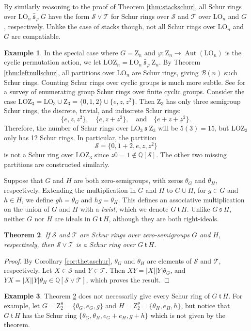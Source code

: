 \documentclass{article}
\theoremstyle{plain}
\newtheorem{Thm}{Theorem}[section]
\theoremstyle{definition}
\newtheorem{Exam}[Thm]{Example}
\newcommand{\thmref}[1]{Theorem \ref{#1}}
\newcommand{\corref}[1]{Corollary \ref{#1}}
\renewcommand{\S}{\mathcal{S}}
\newcommand{\T}{\mathcal{T}}
\newcommand{\Q}{\mathbb{Q}}
\newcommand{\QS}{\Q[\S]}
\newcommand{\B}{\mathscr{B}}
\newcommand{\LO}{\mathrm{LO}}
\newcommand{\LOZ}{\mathrm{LOZ}}
\newcommand{\z}{\mathrm{Z}}
\newcommand{\s}{\ \mathfrak{s}\ }
\newcommand{\shat}{\ \hat{\mathfrak{s}}_\varphi\ }
\renewcommand{\t}{\ \mathfrak{t}\ }
\DeclareMathOperator*{\Aut}{Aut}
\begin{document}
By similarly reasoning to the proof of \thmref{thm:stackschur}, all Schur rings over $\LO_n\shat G$ have the form $\S\vee\T$ for Schur rings over $\S$ and $\T$ over $\LO_n$ and $G$, respectively. Unlike the case of stacks though, not all Schur rings over $\LO_n$ and $G$ are compatiable.

\begin{Exam}
    In the special case where $G=\z_n$ and $\varphi : \z_n \to \Aut(\LO_n)$ is the cyclic permutation action, we let \label{lozn}$\LOZ_n = \LO_n\shat \z_n$. By \thmref{thm:leftnullschur}, all partitions over $\LO_n$ are Schur rings, giving $\B(n)$ such Schur rings. Counting Schur rings over cyclic groups is much more subtle. See \cite{CountingII} for a survey of enumerating group Schur rings over finite cyclic groups. Consider the case $\LOZ_3 = \LO_3\cup \z_3 = \{0,1,2\}\cup \{e,z,z^2\}$. Then $\z_3$ has only three semigroup Schur rings, the discrete, trivial, and indiscrete Schur rings: \[\{ e,z,z^2 \},\quad \{ e, z+z^2 \},\quad\text{and}\quad \{ e+z+z^2\}.\] Therefore, the number of Schur rings over $\LO_3\s\z_3$ will be $5(3)=15$, but $\LOZ_3$ only has 12 Schur rings. In particular, the partition
\[\S = \{ 0, 1+2, e,z,z^2 \}\] is not a Schur ring over $\LOZ_3$ since $z0 = 1 \notin \QS$. The other two missing partitions are constructed similarly.
\end{Exam}

Suppose that $G$ and $H$ are both zero-semigroups, with zeros $\theta_G$ and $\theta_H$, respectively. Extending the multiplication in $G$ and $H$ to $G\cup H$, for $g\in G$ and $h\in H$, we define $gh = \theta_G$ and $hg=\theta_H$. This defines an associative multiplication on the union of $G$ and $H$ with a \emph{twist}, which we denote \label{twist}$G\t H$. Unlike $G\s H$, neither $G$ nor $H$ are ideals in $G\t H$, although they are both right-ideals.  

\begin{Thm}\label{thm:veebarschur} If $\S$ and $\T$ are Schur rings over zero-semigroups $G$ and $H$, respectively, then $\S\vee \T$ is a Schur ring over $G \t H$. 
\end{Thm}
\begin{proof}
By \corref{cor:thetaschur}, $\theta_G$ and $\theta_H$ are elements of $\S$ and $\T$, respectively. Let $X\in \S$ and $Y\in \T$. Then $XY = |X||Y|\theta_G$, and $YX = |X||Y|\theta_H\in \Q[\S\vee \T]$, which proves the result.
\end{proof}

\begin{Exam}\label{exam:veebar}
\thmref{thm:veebarschur} does not necessarily give every Schur ring of $G\t H$. For example, let $G=\z_2^\theta=\{\theta_G, e_G, g\}$ and $H=\z_2^\theta=\{\theta_H, e_H, h\}$, but notice that $G\t H$ has the Schur ring $\{\theta_G, \theta_H, e_G+ e_H, g+ h\}$ which is not given by the theorem.
\end{Exam}
\end{document}
